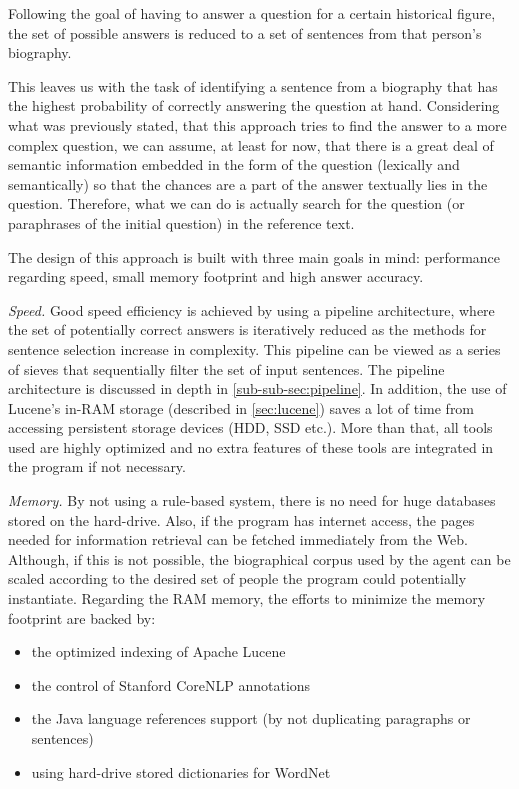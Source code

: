 Following the goal of having to answer a question for a certain historical figure, the set of possible answers is reduced to a set of sentences from that person's biography.

This leaves us with the task of identifying a sentence from a biography that has the highest probability of correctly answering the question at hand.
Considering what was previously stated, that this approach tries to find the answer to a more complex question, we can assume, at least for now, that there is a great deal of semantic information embedded in the form of the question (lexically and semantically) so that the chances are a part of the answer textually lies in the question. Therefore, what we can do is actually search for the question (or paraphrases of the initial question) in the reference text.

The design of this approach is built with three main goals in mind: performance regarding speed, small memory footprint and high answer accuracy.

{\em Speed.} Good speed efficiency is achieved by using a pipeline architecture, where the set of potentially correct answers is iteratively reduced as the methods for sentence selection increase in complexity. This pipeline can be viewed as a series of sieves that sequentially filter the set of input sentences. The pipeline architecture is discussed in depth in \autoref{sub-sub-sec:pipeline}. In addition, the use of Lucene's in-RAM storage (described in \autoref{sec:lucene}) saves a lot of time from accessing persistent storage devices (HDD, SSD etc.). More than that, all tools used are highly optimized and no extra features of these tools are integrated in the program if not necessary.

{\em Memory.} By not using a rule-based system, there is no need for huge databases stored on the hard-drive. Also, if the program has internet access, the pages needed for information retrieval can be fetched immediately from the Web. Although, if this is not possible, the biographical corpus used by the agent can be scaled according to the desired set of people the program could potentially instantiate. Regarding the RAM memory, the efforts to minimize the memory footprint are backed by:

\begin{itemize}
  \item the optimized indexing of Apache Lucene
  \item the control of Stanford CoreNLP annotations
  \item the Java language references support (by not duplicating paragraphs or sentences)
  \item using hard-drive stored dictionaries for WordNet
\end{itemize}

